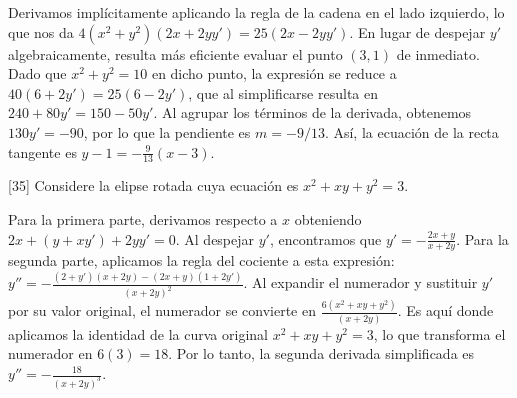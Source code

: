 \documentclass[11pt,paper=a4,answers, addpoints]{exam}
\begin{document}
\begin{questions}
\begin{solution}
Derivamos implícitamente aplicando la regla de la cadena en el lado izquierdo, lo que nos da $4(x^2+y^2)(2x + 2y y') = 25(2x - 2y y')$. En lugar de despejar $y'$ algebraicamente, resulta más eficiente evaluar el punto $(3,1)$ de inmediato. Dado que $x^2+y^2=10$ en dicho punto, la expresión se reduce a $40(6 + 2y') = 25(6 - 2y')$, que al simplificarse resulta en $240 + 80y' = 150 - 50y'$. Al agrupar los términos de la derivada, obtenemos $130y' = -90$, por lo que la pendiente es $m = -9/13$. Así, la ecuación de la recta tangente es $y - 1 = -\frac{9}{13}(x - 3)$.
\end{solution}

[35]
Considere la elipse rotada cuya ecuación es $x^2 + xy + y^2 = 3$. 

\begin{solution}
Para la primera parte, derivamos respecto a $x$ obteniendo $2x + (y + xy') + 2yy' = 0$. Al despejar $y'$, encontramos que $y' = -\frac{2x+y}{x+2y}$. Para la segunda parte, aplicamos la regla del cociente a esta expresión: $y'' = -\frac{(2+y')(x+2y) - (2x+y)(1+2y')}{(x+2y)^2}$. Al expandir el numerador y sustituir $y'$ por su valor original, el numerador se convierte en $\frac{6(x^2+xy+y^2)}{(x+2y)}$. Es aquí donde aplicamos la identidad de la curva original $x^2+xy+y^2=3$, lo que transforma el numerador en $6(3)=18$. Por lo tanto, la segunda derivada simplificada es $y'' = -\frac{18}{(x+2y)^3}$.
\end{solution}

\end{questions}
\end{document}
